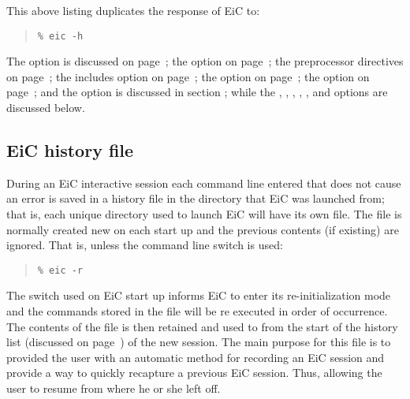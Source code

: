 This above listing duplicates the response of EiC to:
\begin{quote}
\begin{verbatim}
% eic -h
\end{verbatim}
\end{quote}

The  option is discussed on page~\pageref{item:showline};
the  option on page~\pageref{item:trace}; the preprocessor
directives on page~\pageref{item:comm-switch}; the  includes
option on page~\pageref{item:includes}; the  option on
page~\pageref{item:timer}; the  option on
page~\pageref{item:verbose}; and the  option is discussed in
section
; while the , ,
, , ,  and
 options are discussed below.

\subsection{EiC history file}
\label{sec:Historyfile}

During an EiC interactive session each command line entered that does
not cause an error is saved in a history file
 in
the directory that EiC was launched from; that is, each unique
directory used to launch EiC will have its own 
file. The file is normally created new on each start up and the
previous contents (if existing) are ignored. That is, unless the command line
switch  is used:

\begin{quote}
\begin{verbatim}
% eic -r
\end{verbatim}
\end{quote}

The switch  used on EiC start up informs EiC to enter its
re-initialization mode and the commands stored in the file
 will be re executed in order of occurrence. 
The contents of the file
 is then retained and used to from the start of the
history list (discussed on page~\pageref{item:history}) of the new
session. The main purpose for this file is to provided the user with
an automatic method for recording an EiC session and provide a way to
quickly recapture a previous EiC session. Thus, allowing the user to
resume from where he or she left off.



